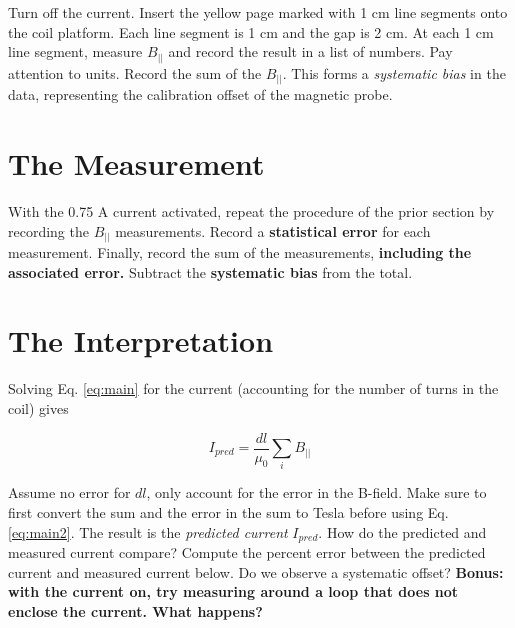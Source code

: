 \documentclass[12pt]{article}
\begin{document}
Turn off the current.  Insert the yellow page marked with 1 cm line segments onto the coil platform.  Each line segment is 1 cm and the gap is 2 cm.  At each 1 cm line segment, measure $B_{||}$ and record the result in a list of numbers.  Pay attention to units.  Record the sum of the $B_{||}$.  This forms a \textit{systematic bias} in the data, representing the calibration offset of the magnetic probe. \\ \vspace{4cm}

\section{The Measurement}

With the 0.75 A current activated, repeat the procedure of the prior section by recording the $B_{||}$ measurements.  Record a \textbf{statistical error} for each measurement.  Finally, record the sum of the measurements, \textbf{including the associated error.}  Subtract the \textbf{systematic bias} from the total. \\ \vspace{4cm}

\section{The Interpretation}

Solving Eq. \ref{eq:main} for the current (accounting for the number of turns in the coil) gives

\begin{equation}
I_{pred} = \frac{dl}{\mu_0} \sum_i B_{||} \label{eq:main2}
\end{equation}

Assume no error for $dl$, only account for the error in the B-field.  Make sure to first convert the sum and the error in the sum to Tesla before using Eq. \ref{eq:main2}.  The result is the \textit{predicted current} $I_{pred}$.  How do the predicted and measured current compare?  Compute the percent error between the predicted current and measured current below.  Do we observe a systematic offset? \textbf{Bonus: with the current on, try measuring around a loop that does not enclose the current.  What happens?} \\ \vspace{7cm}
\end{document}
